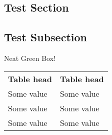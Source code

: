 \documentclass[10pt]{article}
\begin{document}
\begin{multicols}{2}
\selectfont %
\section*{Test Section}
\lipsum[1]
\subsection*{Test Subsection}
    \begin{commentbox}{Neat Green Box!}
        \lipsum[1]
    \end{commentbox}
    \lipsum[3]
    \noindent
    
    \begin{lmss} %
    \begin{tabularx}{\linewidth}{XX}
        \textbf{Table head}  & \textbf{Table head} \\
        Some value  & Some value \\
        Some value  & Some value \\
        Some value  & Some value
    \end{tabularx}
    \end{lmss}


\end{multicols}
\end{document}
